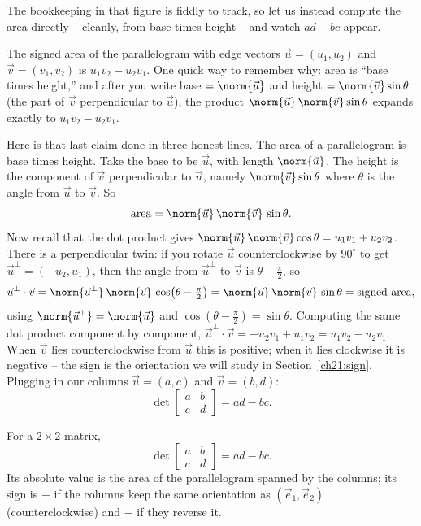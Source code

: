 The bookkeeping in that figure is fiddly to track, so let us instead compute the
area directly -- cleanly, from base times height -- and watch $ad-bc$ appear.

\begin{intuitionbox}
The signed area of the parallelogram with edge vectors $\vec{u}=(u_1,u_2)$ and
$\vec{v}=(v_1,v_2)$ is $u_1 v_2 - u_2 v_1$. One quick way to remember why: area is
``base times height,'' and after you write base $=\norm{\vec u}$ and height
$=\norm{\vec v}\sin\theta$ (the part of $\vec v$ perpendicular to $\vec u$), the
product $\norm{\vec u}\,\norm{\vec v}\sin\theta$ expands exactly to
$u_1 v_2 - u_2 v_1$.
\end{intuitionbox}

Here is that last claim done in three honest lines. The area of a parallelogram is
base times height. Take the base to be $\vec u$, with length $\norm{\vec u}$. The
height is the component of $\vec v$ perpendicular to $\vec u$, namely
$\norm{\vec v}\sin\theta$ where $\theta$ is the angle from $\vec u$ to $\vec v$.
So
\[
  \text{area} = \norm{\vec u}\,\norm{\vec v}\,\sin\theta.
\]
Now recall that the dot product gives $\norm{\vec u}\,\norm{\vec v}\cos\theta =
u_1 v_1 + u_2 v_2$. There is a perpendicular twin: if you rotate $\vec u$
counterclockwise by $90^\circ$ to get $\vec u^{\perp} = (-u_2, u_1)$, then the
angle from $\vec u^\perp$ to $\vec v$ is $\theta - \tfrac{\pi}{2}$, so
\[
  \vec u^{\perp}\cdot \vec v
  = \norm{\vec u^\perp}\,\norm{\vec v}\,\cos\!\big(\theta-\tfrac{\pi}{2}\big)
  = \norm{\vec u}\,\norm{\vec v}\,\sin\theta = \text{signed area},
\]
using $\norm{\vec u^\perp} = \norm{\vec u}$ and
$\cos(\theta-\tfrac{\pi}{2}) = \sin\theta$. Computing the same dot product
component by component, $\vec u^{\perp}\cdot \vec v = -u_2 v_1 + u_1 v_2 =
u_1 v_2 - u_2 v_1$. When $\vec v$ lies counterclockwise from $\vec u$ this is
positive; when it lies clockwise it is negative -- the sign is the orientation we
will study in Section~\ref{ch21:sign}. Plugging in our columns
$\vec u = (a,c)$ and $\vec v = (b,d)$:
\[
  \boxed{\ \det\!\begin{bmatrix} a & b \\ c & d \end{bmatrix} = ad - bc.\ }
\]

\begin{formalbox}
For a $2\times 2$ matrix,
\[
  \det\begin{bmatrix} a & b \\ c & d \end{bmatrix} = ad - bc.
\]
Its absolute value is the area of the parallelogram spanned by the columns; its
sign is $+$ if the columns keep the same orientation as $(\vec e_1, \vec e_2)$
(counterclockwise) and $-$ if they reverse it.
\end{formalbox}

